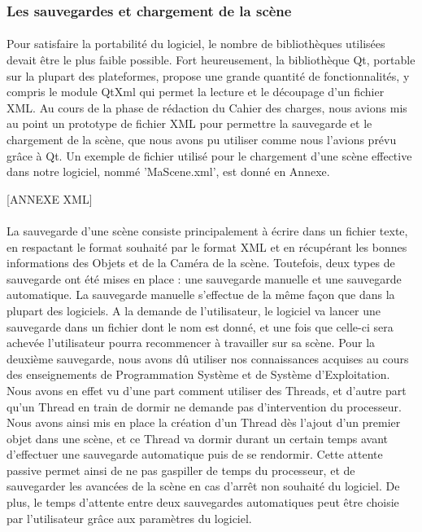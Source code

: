 \subsubsection{Les sauvegardes et chargement de la scène}
\paragraph{}
Pour satisfaire la portabilité du logiciel, le nombre de bibliothèques utilisées devait être le plus faible possible. Fort heureusement, la bibliothèque Qt, portable sur la plupart des plateformes, propose une grande quantité de fonctionnalités, y compris le module QtXml qui permet la lecture et le découpage d'un fichier XML. Au cours de la phase de rédaction du Cahier des charges, nous avions mis au point un prototype de fichier XML pour permettre la sauvegarde et le chargement de la scène, que nous avons pu utiliser comme nous l'avions prévu grâce à Qt. Un exemple de fichier utilisé pour le chargement d'une scène effective dans notre logiciel, nommé 'MaScene.xml', est donné en Annexe.

[ANNEXE XML]

\paragraph{}
La sauvegarde d'une scène consiste principalement à écrire dans un fichier texte, en respactant le format souhaité par le format XML et en récupérant les bonnes informations des Objets et de la Caméra de la scène. Toutefois, deux types de sauvegarde ont été mises en place : une sauvegarde manuelle et une sauvegarde automatique.
La sauvegarde manuelle s'effectue de la même façon que dans la plupart des logiciels. A la demande de l'utilisateur, le logiciel va lancer une sauvegarde dans un fichier dont le nom est donné, et une fois que celle-ci sera achevée l'utilisateur pourra recommencer à travailler sur sa scène.
Pour la deuxième sauvegarde, nous avons dû utiliser nos connaissances acquises au cours des enseignements de Programmation Système et de Système d'Exploitation. Nous avons en effet vu d'une part comment utiliser des Threads, et d'autre part qu'un Thread en train de dormir ne demande pas d'intervention du processeur. Nous avons ainsi mis en place la création d'un Thread dès l'ajout d'un premier objet dans une scène, et ce Thread va dormir durant un certain temps avant d'effectuer une sauvegarde automatique puis de se rendormir. Cette attente passive permet ainsi de ne pas gaspiller de temps du processeur, et de sauvegarder les avancées de la scène en cas d'arrêt non souhaité du logiciel. De plus, le temps d'attente entre deux sauvegardes automatiques peut être choisie par l'utilisateur grâce aux paramètres du logiciel.

